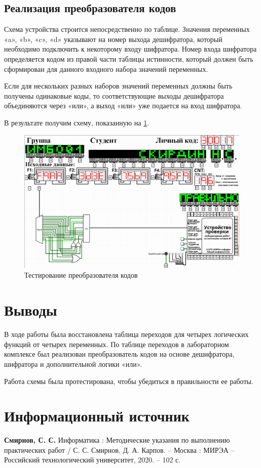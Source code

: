 \documentclass[14pt, a4paper]{extreport}
\begin{document}
\section{Реализация преобразователя кодов}
Схема устройства строится непосредственно по таблице. Значения переменных «a», «b», «c», «d» указывают на номер выхода дешифратора, который необходимо подключить к некоторому входу шифратора. Номер входа шифратора определяется кодом из правой части таблицы истинности, который должен быть сформирован для данного входного набора значений переменных.

Если для нескольких разных наборов значений переменных должны быть получены одинаковые коды, то соответствующие выходы дешифратора объединяются через «или», а выход «или» уже подается на вход шифратора.

В результате получим схему, показанную на \cref{fig:code}.

\begin{figure}[H]
	\caption{Тестирование преобразователя кодов}
	\label{fig:code}
	\includegraphics[width=\textwidth]{code}
\end{figure}

\chapter{Выводы}
В ходе работы была восстановлена таблица переходов для четырех логических функций от четырех переменных. По таблице переходов в лабораторном комплексе был реализован преобразователь кодов на основе дешифратора, шифратора и дополнительной логики «или».

Работа схемы была протестирована, чтобы убедиться в правильности ее работы.

\chapter{Информационный источник}
\textbf{Смирнов, С. С.} Информатика : Методические указания по выполнению практических работ / С. С. Смирнов, Д. А. Карпов. -- Москва : МИРЭА -- Российский технологический университет, 2020. -- 102 с.
\end{document}
